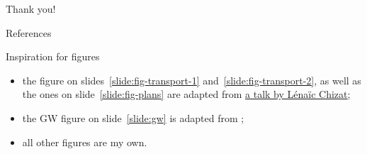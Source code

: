 \documentclass[9pt,xcolor={dvipsnames}]{beamer}
\begin{document}
\begin{frame}[standout]
    Thank you!
\end{frame}

\appendix


\begin{frame}[allowframebreaks]{References}

    
    

  \end{frame}

\begin{frame}{Inspiration for figures}
    \begin{itemize}
        \item the figure on slides~\ref{slide:fig-transport-1} and~\ref{slide:fig-transport-2}, as well as the ones on slide~\ref{slide:fig-plans} are adapted from \href{https://lchizat.github.io/files/presentations/chizat2019IFCAM_OT.pdf}{\underline{a talk by Lénaïc Chizat}};
        \item the GW figure on slide~\ref{slide:gw} is adapted from \cite{peyre2019computational};
        \item all other figures are my own.
    \end{itemize}
\end{frame}
\end{document}
